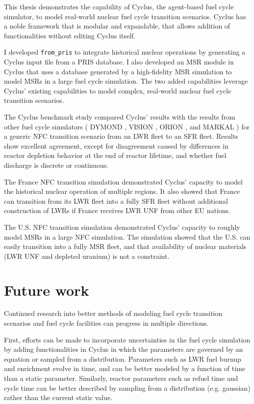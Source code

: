 This thesis demonstrates the capability of Cyclus, the agent-based
fuel cycle simulator, to model real-world nuclear fuel cycle
transition scenarios. Cyclus has a noble framework that is
modular and expandable, that allows addition of functionalities
without editing Cyclus itself.

I developed \texttt{from\_pris}
to integrate historical nuclear operations by generating
a Cyclus input file from a \gls{PRIS} database. I also
developed an \gls{MSR} module in Cyclus that uses a database
generated by a high-fidelity \gls{MSR} simulation to model
\glspl{MSR} in a large fuel cycle simulation. The two
added capabilities leverage Cyclus' existing capabilities
to model complex, real-world nuclear fuel cycle transition
scenarios.

The Cyclus benchmark study compared Cyclus' results with
the results from other fuel cycle simulators
(
DYMOND \cite{yacout_modeling_2005},
VISION \cite{jacobson_verifiable_2010},
ORION \cite{gregg_analysis_2012}, and
MARKAL \cite{shay_epa_2006}
) for a generic \gls{NFC} transition scenario from an
\gls{LWR} fleet to an \gls{SFR} fleet. Results show
excellent agreement, except for disagreement caused 
by differences in reactor depletion
behavior at the end of reactor lifetime, and
whether fuel discharge is discrete or continuous.

The France \gls{NFC} transition simulation demonstrated
Cyclus' capacity to model the historical nuclear operation
of multiple regions. It also showed that
France can transition from its \gls{LWR} fleet into a fully \gls{SFR} fleet
without additional construction of \glspl{LWR} if France receives
\gls{LWR} \gls{UNF} from other \gls{EU} nations.

The U.S. \gls{NFC} transition simulation demonstrated
Cyclus' capacity to roughly model \glspl{MSR} in
a large \gls{NFC} simulation. The simulation showed
that the U.S. can easily transition into a fully
\gls{MSR} fleet, and that availability of nuclear materials
(\gls{LWR} \gls{UNF} and depleted uranium) is not a constraint.



\section{Future work}
Continued research into better methods of modeling fuel cycle
transition scenarios and fuel cycle facilities can progress
in multiple directions. 

First, efforts can be made to incorporate
uncertainties in the fuel cycle simulation by adding functionalities
in Cyclus in which the parameters are governed by an equation
or sampled from a distribution. Parameters such as \gls{LWR} fuel
burnup and enrichment evolve in time, and can be better modeled
by a function of time than a static parameter. Similarly, reactor parameters
such as refuel time and cycle time can be better described by sampling
from a distribution (e.g. gaussian) rather than the current static
value.

